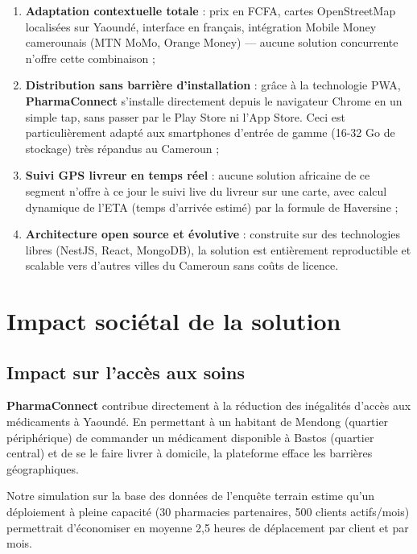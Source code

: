 \documentclass[12pt,a4paper,oneside]{report}
\newcommand{\pharma}{\textcolor{vertpharma}{\textbf{PharmaConnect}}}
\begin{document}
\begin{enumerate}
  \item \textbf{Adaptation contextuelle totale} : prix en FCFA, cartes OpenStreetMap localisées sur Yaoundé, interface en français, intégration Mobile Money camerounais (MTN MoMo, Orange Money) — aucune solution concurrente n'offre cette combinaison ;

  \item \textbf{Distribution sans barrière d'installation} : grâce à la technologie PWA, \pharma{} s'installe directement depuis le navigateur Chrome en un simple tap, sans passer par le Play Store ni l'App Store. Ceci est particulièrement adapté aux smartphones d'entrée de gamme (16-32 Go de stockage) très répandus au Cameroun ;

  \item \textbf{Suivi GPS livreur en temps réel} : aucune solution africaine de ce segment n'offre à ce jour le suivi live du livreur sur une carte, avec calcul dynamique de l'ETA (temps d'arrivée estimé) par la formule de Haversine ;

  \item \textbf{Architecture open source et évolutive} : construite sur des technologies libres (NestJS, React, MongoDB), la solution est entièrement reproductible et scalable vers d'autres villes du Cameroun sans coûts de licence.
\end{enumerate}

\section{Impact sociétal de la solution}

\subsection{Impact sur l'accès aux soins}

\pharma{} contribue directement à la réduction des inégalités d'accès aux médicaments à Yaoundé. En permettant à un habitant de Mendong (quartier périphérique) de commander un médicament disponible à Bastos (quartier central) et de se le faire livrer à domicile, la plateforme efface les barrières géographiques.

Notre simulation sur la base des données de l'enquête terrain estime qu'un déploiement à pleine capacité (30 pharmacies partenaires, 500 clients actifs/mois) permettrait d'économiser en moyenne 2,5 heures de déplacement par client et par mois.
\end{document}
